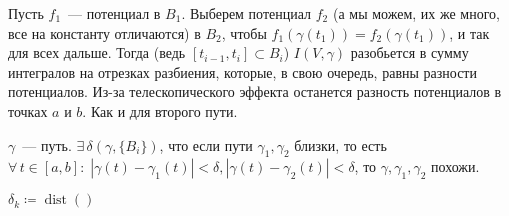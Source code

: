 \begin{Proof}
	Пусть $f_1$~--- потенциал в $B_1$. Выберем потенциал $f_2$ (а мы можем, их же много, все на константу отличаются) в $B_2$, чтобы $f_1(\gamma(t_1))=f_2(\gamma(t_1))$, и так для всех дальше. Тогда (ведь $[t_{i-1},t_i]\subset B_i$) $I(V,\gamma)$ разобьется в сумму интегралов на отрезках разбиения, которые, в свою очередь, равны разности потенциалов. Из-за телескопического эффекта останется разность потенциалов в точках $a$ и $b$. Как и для второго пути.
\end{Proof}

\begin{Theorem*}
	$\gamma$~--- путь. \THEN $\exists\,\delta(\gamma,\{B_i\})$, что если пути $\gamma_1,\gamma_2$ близки, то есть $\forall\,t\in[a,b]:\;|\gamma(t)-\gamma_1(t)|<\delta,|\gamma(t)-\gamma_2(t)|<\delta$, то $\gamma,\gamma_1,\gamma_2$ похожи.
\end{Theorem*}

\begin{Proof}
	$\delta_k\coloneqq\operatorname{dist}()$
\end{Proof}

\newpage

